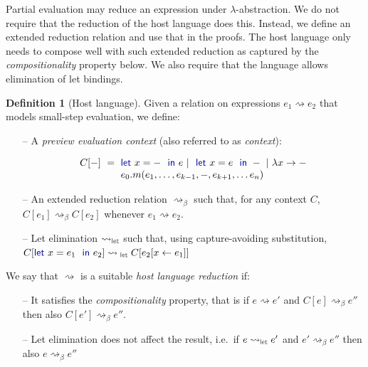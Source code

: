 \documentclass[acmsmall,anonymous,fleqn]{acmart}\settopmatter{printfolios=false,printccs=false,printacmref=false}
\newcounter{dfc}
\theoremstyle{plain}
\theoremstyle{definition}
\newtheorem{definition}[dfc]{Definition}
\newcommand{\ident}[1]{\textnormal{\textcolor{idclr}{\sffamily #1}}}
\newcommand{\kvd}[1]{\textnormal{\textcolor{kvdclr}{\sffamily #1}}}
\begin{document}
Partial evaluation may reduce an expression under $\lambda$-abstraction. We do not require that
the reduction of the host language does this. Instead, we define an extended reduction relation
and use that in the proofs. The host language only needs to compose well with such extended reduction
as captured by the \emph{compositionality} property below. We also require that the language allows
elimination of let bindings.

\begin{definition}[Host language]
\label{def:host}
Given a relation on expressions $e_1 \rightsquigarrow e_2$ that models small-step evaluation, we define:

\begin{itemize}
\item[--]
 A \emph{preview evaluation context} (also referred to as \emph{context}):

\vspace{-1.25em}
\begin{equation*}
\begin{array}{lcl}
C[-] &\hspace{-1em}=\hspace{-1em}& \kvd{let}~x = -~\kvd{in}~e ~|~ \kvd{let}~x = e~\kvd{in}~- ~|~ \lambda x\rightarrow - \\
     &&  e_0.m(e_1, \ldots, e_{k-1}, -, e_{k+1}, \ldots e_n)
\end{array}
\end{equation*}

\item[--]
An extended reduction relation $\rightsquigarrow_\beta$ such that, for any context $C$,
$C[e_1] \rightsquigarrow_\beta C[e_2]$ whenever $e_1 \rightsquigarrow e_2$.

\item[--]
Let elimination $\rightsquigarrow_\ident{let}$ such that, using  capture-avoiding substitution,
  $C[\kvd{let}~x=e_1~\kvd{in}~e_2] \rightsquigarrow_\ident{let} C[e_2[x\leftarrow e_1]]$
\end{itemize}

\noindent
We say that $\rightsquigarrow$ is a suitable \emph{host language reduction} if:
\begin{itemize}
\item[--] It satisfies the \emph{compositionality} property, that is if $e \rightsquigarrow e'$ and
$C[e]\rightsquigarrow_\beta e''$ then also $C[e']\rightsquigarrow_\beta e''$.

\item[--] Let elimination does not affect the result, i.e.~if $e \rightsquigarrow_{\ident{let}} e'$
and $e'\rightsquigarrow_\beta e''$ then also $e\rightsquigarrow_\beta e''$
\end{itemize}
\end{definition}
\end{document}
